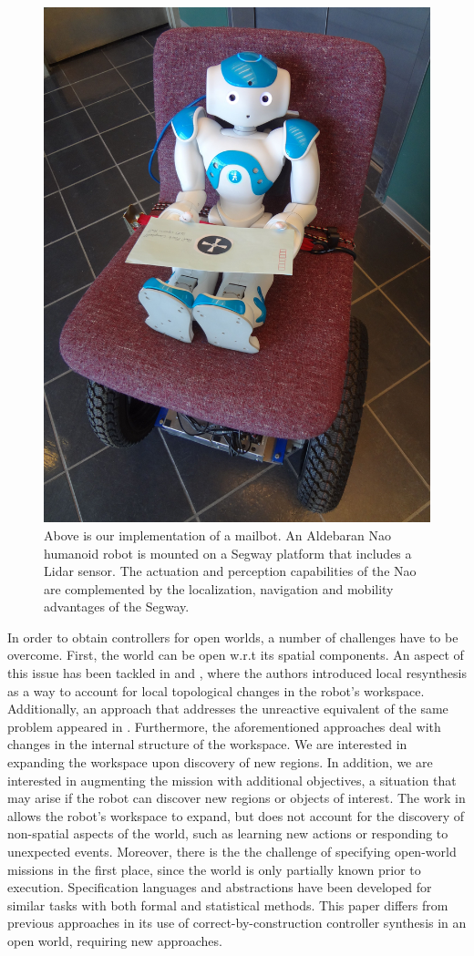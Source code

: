 \begin{figure}[t]
	\centering
	\includegraphics[width=0.7\columnwidth, clip]{./img/mailbot.jpg}
	\caption{Above is our implementation of a mailbot. An Aldebaran Nao humanoid robot is mounted on a Segway platform that includes a Lidar sensor. The actuation and perception capabilities of the Nao are complemented by the localization, navigation and mobility advantages of the Segway.}
	\label{Fig:mailbot}
\end{figure}

In order to obtain controllers for open worlds, a number of challenges have to be overcome. 
First, the world can be open w.r.t its spatial components. An aspect of this issue has been tackled in \cite{MurrayICRA2012} and \cite{MurrayICRA2013a}, where the authors introduced local resynthesis as a way to account for local topological changes in the robot's workspace. 
Additionally, an approach that addresses the unreactive equivalent of the same problem appeared in \cite{Dimos2013ICRA}. 
Furthermore, the aforementioned approaches deal with changes in the internal structure of the workspace. We are interested in expanding the workspace upon discovery of new regions.
In addition, we are interested in augmenting the mission with additional objectives, a situation that may arise if the robot can discover new regions or objects of interest. 
The work in \cite{BingxinRSS2012} allows the robot's workspace to expand, but does not account for the discovery of non-spatial aspects of the world, such as learning new actions or responding to unexpected events.
Moreover, there is the the challenge of specifying open-world missions in the first place, since the world is only partially known prior to execution. 
Specification languages and abstractions have been developed for similar tasks with both formal \cite{Joshi2012, MatthiasAI2010} and statistical \cite{Tellex2011} methods.
This paper differs from previous approaches in its use of correct-by-construction controller synthesis in an open world, requiring new approaches. 

